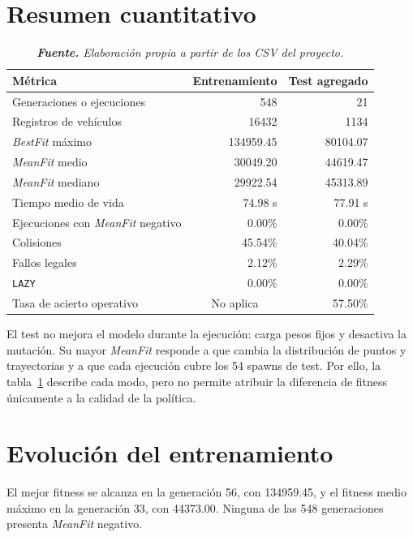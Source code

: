 \section{Resumen cuantitativo}

\begin{table}[htbp]
\centering
\caption{Resultados principales del entrenamiento y del bloque de test del 18 de junio de 2026.}%
\label{tab:resultados-principales}
\begin{tabular}{lrr}
\toprule
\textbf{Métrica} & \textbf{Entrenamiento} & \textbf{Test agregado}\\
\midrule
Generaciones o ejecuciones & 548 & 21\\
Registros de vehículos & 16432 & 1134\\
\textit{BestFit} máximo & 134959.45 & 80104.07\\
\textit{MeanFit} medio & 30049.20 & 44619.47\\
\textit{MeanFit} mediano & 29922.54 & 45313.89\\
Tiempo medio de vida & 74.98 s & 77.91 s\\
Ejecuciones con \textit{MeanFit} negativo & 0.00\% & 0.00\%\\
Colisiones & 45.54\% & 40.04\%\\
Fallos legales & 2.12\% & 2.29\%\\
\texttt{LAZY} & 0.00\% & 0.00\%\\
Tasa de acierto operativo & \multicolumn{1}{c}{No aplica} & 57.50\%\\
\bottomrule
\end{tabular}
\caption*{\textit{\textbf{Fuente.} Elaboración propia a partir de los CSV del proyecto.}}
\end{table}

El test no mejora el modelo durante la ejecución: carga pesos fijos y desactiva la mutación. Su mayor \textit{MeanFit} responde a que cambia la distribución de puntos y trayectorias y a que cada ejecución cubre los 54 spawns de test. Por ello, la tabla~\ref{tab:resultados-principales} describe cada modo, pero no permite atribuir la diferencia de fitness únicamente a la calidad de la política.

\clearpage
\section{Evolución del entrenamiento}

El mejor fitness se alcanza en la generación 56, con 134959.45, y el fitness medio máximo en la generación 33, con 44373.00. Ninguna de las 548 generaciones presenta \textit{MeanFit} negativo.

